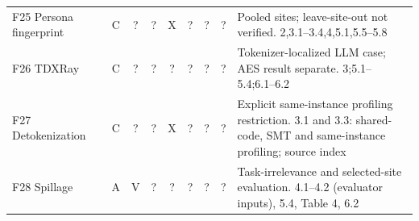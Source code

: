 \begin{table}[p]
\begin{tabularx}{\textwidth}{@{}p{}cccccccY@{}}
F25 Persona fingerprint~\cite{song2026personafingerprint} & C & ? & ? & X & ? & ? & ? & Pooled sites; leave-site-out not verified. 2,3.1--3.4,4,5.1,5.5--5.8\\
F26 TDXRay~\cite{hornetz2026tdxray} & C & ? & ? & ? & ? & ? & ? & Tokenizer-localized LLM case; AES result separate. 3;5.1--5.4;6.1--6.2\\
F27 Detokenization~\cite{weiss2026detokenization} & C & ? & ? & X & ? & ? & ? & Explicit same-instance profiling restriction. 3.1 and 3.3: shared-code, SMT and same-instance profiling; source index\\
F28 Spillage~\cite{roh2026spillage} & A & V & ? & ? & ? & ? & ? & Task-irrelevance and selected-site evaluation. 4.1--4.2 (evaluator inputs), 5.4, Table 4, 6.2\\
\bottomrule\end{tabularx}\end{table}
